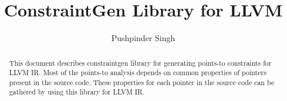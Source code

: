 \documentclass{report}
\title{ConstraintGen Library for LLVM}
\author{Pushpinder Singh}
\begin{document}
\maketitle

\begin{abstract}

This document describes constraintgen library for generating points-to 
constraints for LLVM IR. Most of the points-to analysis depends on common 
properties of pointers present in the source code. These properties for each 
pointer in the source code can be gathered by using this library for LLVM IR.

\end{abstract}





\end{document}
